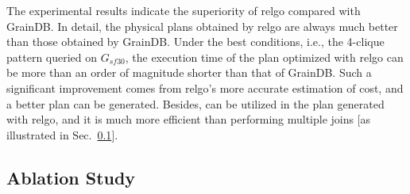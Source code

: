 The experimental results indicate the superiority of relgo compared with GrainDB.
In detail, the physical plans obtained by relgo are always much better than those obtained by GrainDB.
Under the best conditions, i.e., the 4-clique pattern queried on $G_{sf30}$, the execution time of the plan optimized with relgo can be more than an order of magnitude shorter than that of GrainDB.
Such a significant improvement comes from relgo's more accurate estimation of cost, and a better plan can be generated.
Besides, \expandintersectrule can be utilized in the plan generated with relgo, and it is much more efficient than performing multiple joins [as illustrated in Sec.~\ref{sec:experiment-ablation}].



\subsection{Ablation Study}
\label{sec:experiment-ablation}

